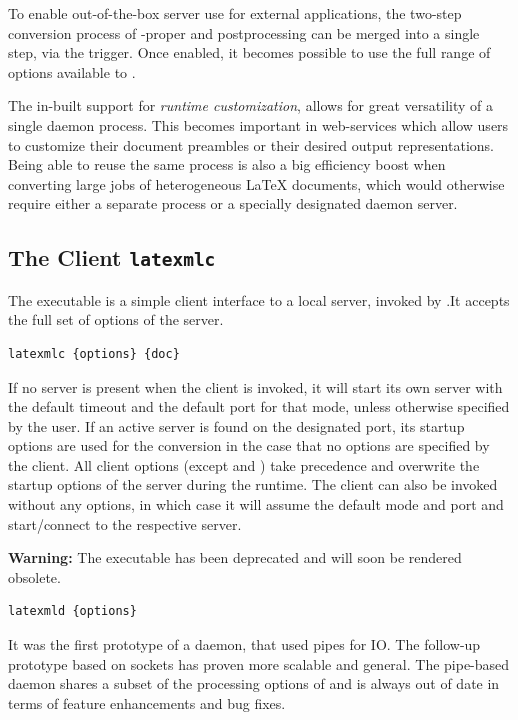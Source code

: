 \documentclass{book}
\begin{document}
To enable out-of-the-box server use for external applications, the two-step conversion
process of {\LaTeXML}-proper and postprocessing can be merged into a single step, via the
 trigger. Once enabled, it becomes possible to use the full range of options
available to .


The in-built support for \textit{runtime customization}, allows for great versatility of a single daemon process. This becomes important in web-services which allow users to customize their document preambles or their desired output representations. Being able to reuse the same process is also a big efficiency boost when converting large jobs of heterogeneous {\LaTeX} documents, which would otherwise require either a separate {\LaTeXML} process or a specially designated daemon server.

\subsection{The {\LaTeXML} Client \texttt{latexmlc}}

The  executable is a simple client interface to a local {\LaTeXML}
server, invoked by .It accepts the full set of options of the server.

\begin{lstlisting}[style=shell]
  latexmlc {options} {doc}
\end{lstlisting}

If no server is present when the client is invoked, it will start its own server with the
default timeout and the default port for that mode, unless otherwise specified by the
user. If an active server is found on the designated port, its startup options are used
for the conversion in the case that no options are specified by the client. All client
options (except  and ) take precedence and
overwrite the startup options of the server during the runtime. The client can also be
invoked without any options, in which case it will assume the default mode and port and
start/connect to the respective server.

\textbf{Warning:} The  executable has been deprecated and will soon be
rendered obsolete. 

\begin{lstlisting}[style=shell]
  latexmld {options}
\end{lstlisting}
It was the first prototype of a \LaTeXML daemon, that used pipes for IO. The follow-up
 prototype based on sockets has proven more scalable and general. The
pipe-based  daemon shares a subset of the processing options of
 and is always out of date in terms of feature enhancements and bug
fixes.
\end{document}
